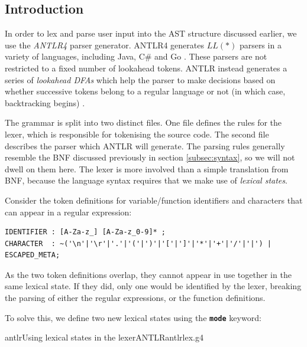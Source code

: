 \documentclass[a4paper,openany,12pt]{book}
\begin{document}
\subsection{Introduction}

In order to lex and parse user input into the AST structure discussed earlier, we use the \emph{ANTLR4} parser generator.
ANTLR4 generates $LL(*)$ parsers in a variety of languages, including Java, C\# and Go \citep{parr2011ll}.
These parsers are not restricted to a fixed number of lookahead tokens.
ANTLR instead generates a series of \emph{lookahead DFAs} which help the parser to make decisions based on whether
successive tokens belong to a regular language or not (in which case, backtracking begins) \citep[p.~3]{parr2011ll}.

The grammar is split into two distinct files.
One file defines the rules for the lexer, which is responsible for tokenising the source code.
The second file describes the parser which ANTLR will generate.
The parsing rules generally resemble the BNF discussed previously in section \ref{subsec:syntax}, so we will not
dwell on them here.
The lexer is more involved than a simple translation from BNF, because the language syntax requires that we make use of
\emph{lexical states}.

Consider the token definitions for variable/function identifiers and characters that can appear in a regular expression:

\begin{verbatim}
IDENTIFIER : [A-Za-z_] [A-Za-z_0-9]* ;
CHARACTER  : ~('\n'|'\r'|'.'|'('|')'|'['|']'|'*'|'+'|'/'|'|') | ESCAPED_META;
\end{verbatim}

As the two token definitions overlap, they cannot appear in use together in the same lexical state.
If they did, only one would be identified by the lexer, breaking the parsing of either the regular expressions, or the
function definitions.

To solve this, we define two new lexical states using the \textbf{\texttt{mode}} keyword:

\newsavebox\myvlex

\begin{lrbox}{\myvlex}\begin{minipage}{\textwidth}
  \begin{mycodefile}{antlr}{\label{code:antlr:1}Using lexical states in the lexer}{ANTLR}{antlrlex.g4}
  \end{mycodefile}
\end{minipage}\end{lrbox}
\end{document}
